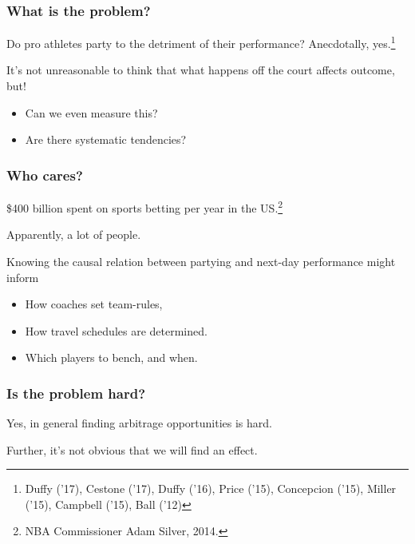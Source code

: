 \documentclass{beamer}
\begin{document}
  \begin{frame} \maketitle \end{frame}

\begin{frame}   \frametitle{What is the problem?}
  \begin{block}{Do pro athletes party to the detriment of their performance?}
    Anecdotally, yes.\footnote{Duffy ('17), Cestone ('17), Duffy ('16), 
      Price ('15), Concepcion ('15), Miller ('15), Campbell ('15), Ball ('12)}

    It's not unreasonable to think that what happens off the court affects outcome, but!
    \begin{itemize}       \item Can we even measure this?
      \item Are there systematic tendencies?     \end{itemize}
  \end{block} \end{frame}

\begin{frame}   
  \frametitle{Who cares?}
  \begin{block}{\$400 billion spent on sports betting per year in the US.\footnote{NBA Commissioner Adam Silver, 2014.}}

    Apparently, a lot of people. 

    Knowing the causal relation between partying and next-day performance might inform
    \begin{itemize}       
      \item How coaches set team-rules, 
      \item How travel schedules are determined.
      \item Which players to bench, and when.
      \end{itemize}
  \end{block}
\end{frame}

\begin{frame}   \frametitle{Is the problem hard?}
  Yes, in general finding arbitrage opportunities is hard.

  Further, it's not obvious that we will find an effect. 

\end{frame}
\end{document}
